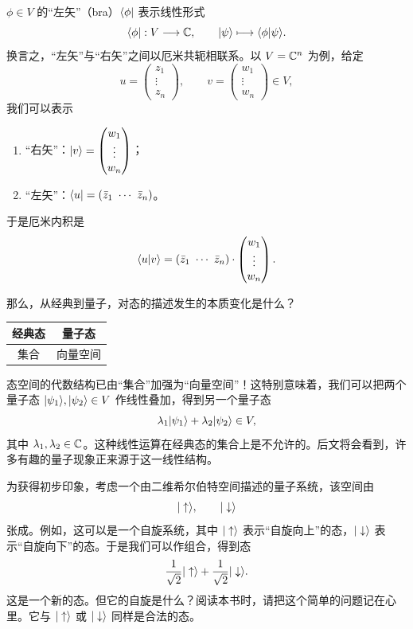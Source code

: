 $\phi\in V$ 的“左矢”（bra）$\langle \phi|$ 表示线性形式
\[
\langle \phi|:V\longrightarrow\mathbb{C},\qquad |\psi\rangle\longmapsto \langle \phi|\psi\rangle.
\]
换言之，“左矢”与“右矢”之间以厄米共轭相联系。以 $V=\mathbb{C}^n$ 为例，给定
\[
u=\begin{pmatrix}z_1\\ \vdots\\ z_n\end{pmatrix},\qquad
v=\begin{pmatrix}w_1\\ \vdots\\ w_n\end{pmatrix}\in V,
\]
我们可以表示
\begin{enumerate}[label=(\arabic*),leftmargin=3.2em,itemsep=1pt]
  \item “右矢”：$|v\rangle=\begin{pmatrix}w_1\\ \vdots\\ w_n\end{pmatrix}$；
  \item “左矢”：$\bra{u}=(\bar z_1\ \cdots\ \bar z_n)$。
\end{enumerate}
于是厄米内积是
\[
\braket{u}{v}=(\bar z_1\ \cdots\ \bar z_n)\cdot
\begin{pmatrix}w_1\\ \vdots\\ w_n\end{pmatrix}.
\]

那么，从经典到量子，对态的描述发生的本质变化是什么？

\begin{center}
\begin{tabular}{c c}
\toprule
经典态 & 量子态\\
\midrule
集合 & 向量空间\\
\bottomrule
\end{tabular}
\end{center}

态空间的代数结构已由“集合”加强为“向量空间”！这特别意味着，我们可以把两个量子态 $|\psi_1\rangle,|\psi_2\rangle\in V$ 作线性叠加，得到另一个量子态
\[
\lambda_1|\psi_1\rangle+\lambda_2|\psi_2\rangle\in V,
\]
其中 $\lambda_1,\lambda_2\in\mathbb{C}$。这种线性运算在经典态的集合上是不允许的。后文将会看到，许多有趣的量子现象正来源于这一线性结构。

为获得初步印象，考虑一个由二维希尔伯特空间描述的量子系统，该空间由
\[
|\uparrow\rangle,\qquad |\downarrow\rangle
\]
张成。例如，这可以是一个自旋系统，其中 $|\uparrow\rangle$ 表示“自旋向上”的态，$|\downarrow\rangle$ 表示“自旋向下”的态。于是我们可以作组合，得到态
\[
\frac{1}{\sqrt2}|\uparrow\rangle+\frac{1}{\sqrt2}|\downarrow\rangle.
\]
这是一个新的态。但它的自旋是什么？阅读本书时，请把这个简单的问题记在心里。它与 $|\uparrow\rangle$ 或 $|\downarrow\rangle$ 同样是合法的态。

